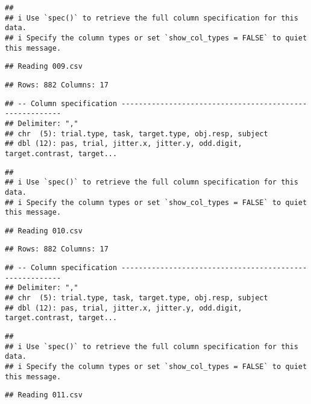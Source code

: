\documentclass[
]{article}
\begin{document}
\begin{verbatim}
## 
## i Use `spec()` to retrieve the full column specification for this data.
## i Specify the column types or set `show_col_types = FALSE` to quiet this message.
\end{verbatim}

\begin{verbatim}
## Reading 009.csv
\end{verbatim}

\begin{verbatim}
## Rows: 882 Columns: 17
\end{verbatim}

\begin{verbatim}
## -- Column specification --------------------------------------------------------
## Delimiter: ","
## chr  (5): trial.type, task, target.type, obj.resp, subject
## dbl (12): pas, trial, jitter.x, jitter.y, odd.digit, target.contrast, target...
\end{verbatim}

\begin{verbatim}
## 
## i Use `spec()` to retrieve the full column specification for this data.
## i Specify the column types or set `show_col_types = FALSE` to quiet this message.
\end{verbatim}

\begin{verbatim}
## Reading 010.csv
\end{verbatim}

\begin{verbatim}
## Rows: 882 Columns: 17
\end{verbatim}

\begin{verbatim}
## -- Column specification --------------------------------------------------------
## Delimiter: ","
## chr  (5): trial.type, task, target.type, obj.resp, subject
## dbl (12): pas, trial, jitter.x, jitter.y, odd.digit, target.contrast, target...
\end{verbatim}

\begin{verbatim}
## 
## i Use `spec()` to retrieve the full column specification for this data.
## i Specify the column types or set `show_col_types = FALSE` to quiet this message.
\end{verbatim}

\begin{verbatim}
## Reading 011.csv
\end{verbatim}
\end{document}
